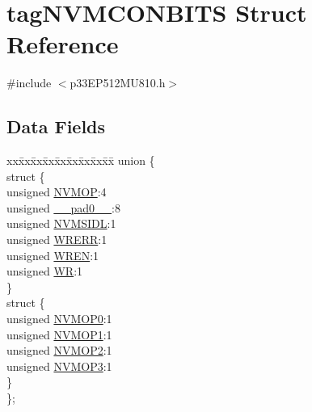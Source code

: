\hypertarget{structtag_n_v_m_c_o_n_b_i_t_s}{}\section{tag\+N\+V\+M\+C\+O\+N\+B\+I\+TS Struct Reference}
\label{structtag_n_v_m_c_o_n_b_i_t_s}


{\ttfamily \#include $<$p33\+E\+P512\+M\+U810.\+h$>$}

\subsection*{Data Fields}
\begin{DoxyCompactItemize}
\item 
\begin{tabbing}
xx\=xx\=xx\=xx\=xx\=xx\=xx\=xx\=xx\=\kill
union \{\\
\>struct \{\\
\>\>unsigned \hyperlink{structtag_n_v_m_c_o_n_b_i_t_s_a616fb588f15a3f49ded626844802ed2c}{NVMOP}:4\\
\>\>unsigned \hyperlink{structtag_n_v_m_c_o_n_b_i_t_s_adf71f3d8410c1f1dbbc96680a92c49af}{\_\_pad0\_\_}:8\\
\>\>unsigned \hyperlink{structtag_n_v_m_c_o_n_b_i_t_s_a88839c1565f14165d715fd65e89b511f}{NVMSIDL}:1\\
\>\>unsigned \hyperlink{structtag_n_v_m_c_o_n_b_i_t_s_a3bb4589054cd59f1b8572d6a902d95ff}{WRERR}:1\\
\>\>unsigned \hyperlink{structtag_n_v_m_c_o_n_b_i_t_s_a8615dca9fd990870b04c31a53bdd72c4}{WREN}:1\\
\>\>unsigned \hyperlink{structtag_n_v_m_c_o_n_b_i_t_s_a93fc7151cdbe1259975f2d8b430a65ee}{WR}:1\\
\>\} \\
\>struct \{\\
\>\>unsigned \hyperlink{structtag_n_v_m_c_o_n_b_i_t_s_a78e988120e0d3fcd3be65a382a1bf6e6}{NVMOP0}:1\\
\>\>unsigned \hyperlink{structtag_n_v_m_c_o_n_b_i_t_s_a47b3ac98f7140927c522725847396cce}{NVMOP1}:1\\
\>\>unsigned \hyperlink{structtag_n_v_m_c_o_n_b_i_t_s_a69646675ff8c0ad6e9b16a0d93bd1976}{NVMOP2}:1\\
\>\>unsigned \hyperlink{structtag_n_v_m_c_o_n_b_i_t_s_ae93087ebcba2a54e3d189798eb859fe3}{NVMOP3}:1\\
\>\} \\
\}; \\

\end{tabbing}\end{DoxyCompactItemize}


